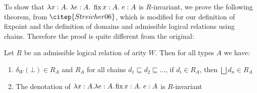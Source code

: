 To show that $\lambda x : A. \ \lambda e : A. \ \operatorname{fix} x : A. \ e : A$ is $R$-invariant, we prove the following theorem, from $\citep{Streicher06}$, which is modified for our definition of fixpoint and the definition of domains and admissible logical relations using chains. Therefore the proof is quite different from the original:

\vspace{0.5cm}

\begin{thm}{\citep{Streicher06}}\label{adm}
Let $R$ be an admissible logical relation of arity $W$. Then for all types $A$ we have:

\begin{enumerate}
\item{$\delta_W(\bot) \in R_A$ and $R_A$ for all chains $d_1 \sqsubseteq d_2 \sqsubseteq \dots$, if  $d_i \in R_A$, then $\bigsqcup d_n \in R_A$}
\item{The denotation of $\lambda x : A. \lambda e : A. \operatorname{fix} x : A. \ e : A$ is $R$-invariant}
\end{enumerate}
\end{thm}

